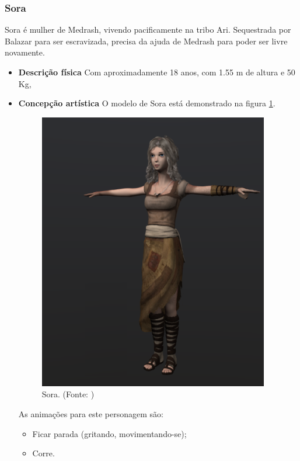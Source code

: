 \subsubsection{Sora}
Sora é mulher de Medrash, vivendo pacificamente na tribo Ari. Sequestrada
 por Balazar para ser escravizada, precisa da ajuda de Medrash para poder
 ser livre novamente.
\begin{itemize}
\item {\bf Descrição física}
Com aproximadamente 18 anos, com 1.55 m de altura e 50 Kg, 
\item {\bf Concepção artística}
O modelo de Sora está demonstrado na figura \ref{img:sora}.

\begin{figure}[H]
 \centering
 \includegraphics[scale=0.8]{Imagens/sora01.png}
 \caption{Sora. (Fonte: \cite{bib:sora01})}
\label{img:sora}
\end{figure}


As animações para este personagem são:
\begin{itemize}
\item Ficar parada (gritando, movimentando-se);
\item Corre.
\end{itemize}
\end{itemize}

